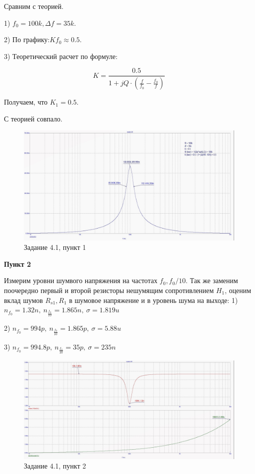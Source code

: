 \documentclass[a4paper, 14pt]{extarticle}%
\begin{document}
Сравним с теорией.

1) $f_0 = 100k, \Delta f = 35k$.

2) По графику:$K{f_0} \approx 0.5$.

3) Теоретический расчет по формуле:

\[ K = \frac{0.5}{1 + jQ\cdot(\frac{f}{f_0} - \frac{f_0}{f})}\]

Получаем, что $K_1 = 0.5$.

С теорией совпало.

\begin{figure}[h!]
			\centering
			\includegraphics[width=1.1\linewidth]{4/4_1_2.jpg}
			\caption{Задание 4.1, пункт 1}
			\label{A}
\end{figure}


\textbf{Пункт 2}


Измерим уровни шумвого напряжения на частотах $f_0, f_0/10$. Так же заменим поочередно первый и второй резисторы нешумящим сопротивлением $H_1$, оценим вклад шумов $R_{s1}, R_1$ в шумовое напряжение и в уровень шума на выходе:
1) $n_{f_0} = 1.32n, \: n_{\frac{f_0}{10}} = 1.865n, \: \sigma = 1.819u$

2) $n_{f_0} = 994p, \: n_{\frac{f_0}{10}} = 1.865p, \: \sigma = 5.88u$

3) $n_{f_0} = 994.8p, \: n_{\frac{f_0}{10}} = 35p, \: \sigma = 235n$

\begin{figure}[h!]
			\centering
			\includegraphics[width=1.1\linewidth]{4/4_1_3.jpg}
			\caption{Задание 4.1, пункт 2}
			\label{A}
\end{figure}
\end{document}
